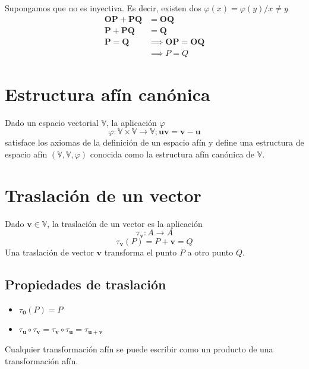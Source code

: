\documentclass{./Geometria.tex}
\begin{document}
\begin{defin}
Supongamos que no es inyectiva. Es decir, existen dos $\varphi(x)=\varphi (y) / x \neq y$ 
\begin{equation}
	\begin{split}		
		\mathbf{OP}+\mathbf{PQ}&=\mathbf{OQ} \\
		\mathbf{P}+\mathbf{PQ}&=\mathbf{Q} \\
		\mathbf{P}=\mathbf{Q} &\implies \mathbf{OP}=\mathbf{OQ} \\
		&\implies P = Q
	\end{split}
\end{equation}
\end{defin}

\section{Estructura af\'in can\'onica}
Dado un espacio vectorial $\mathbb{V}$, la aplicaci\'on $\varphi$
$$
\varphi: \mathbb{V} \times \mathbb{V} \to \mathbb{V}; \mathbf{uv}=\mathbf{v}-\mathbf{u}
$$
satisface los axiomas de la definici\'on de un espacio af\'in y define una estructura de espacio af\'in $(\mathbb{V}, \mathbb{V}, \varphi)$ conocida como la estructura af\'in can\'onica de $\mathbb{V}$.

\section{Traslaci\'on de un vector}
Dado $\mathbf{v}\in \mathbb{V}$, la traslaci\'on de un vector es la aplicaci\'on
$$
\tau_{\mathbf{v}}: A \to A
$$
$$
\tau_{\mathbf{v}} (P)=P+\mathbf{v}=Q
$$
Una traslaci\'on de vector $\mathbf{v}$ transforma el punto $P$ a otro punto $Q$.

\subsection{Propiedades de traslaci\'on}
\begin{itemize}
    \item $\tau_{\mathbf{0}}(P)=P$
    \item $\tau_{\mathbf{u}} \circ \tau_{\mathbf{v}}=\tau_{\mathbf{v}} \circ\tau_{\mathbf{u}}=\tau_{\mathbf{u}+\mathbf{v}}$
\end{itemize}

\begin{teorema}
Cualquier transformación afín se puede escribir como un producto de una transformación afín.
\end{teorema}
\end{document}

